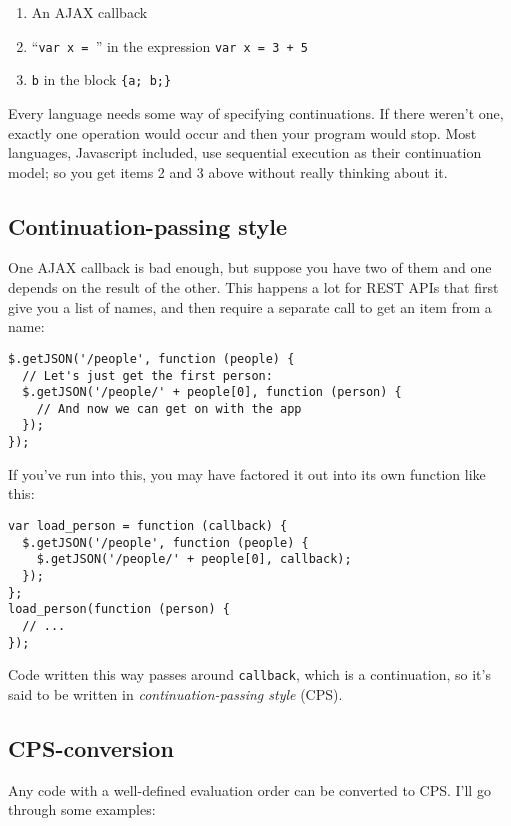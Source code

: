 \documentclass{article}
\begin{document}
\begin{enumerate}
\item{An AJAX callback}
\item{``{\tt var x = }'' in the expression {\tt var x = 3 + 5}}
\item{{\tt b} in the block \verb|{a; b;}|}
\end{enumerate}

    Every language needs some way of specifying continuations. If there weren't one, exactly one operation would occur and then your program would stop. Most languages, Javascript included,
    use sequential execution as their continuation model; so you get items 2 and 3 above without really thinking about it.

\subsection{Continuation-passing style}\label{sec:introducing-continuations-continuation-passing-style}
    One AJAX callback is bad enough, but suppose you have two of them and one depends on the result of the other. This happens a lot for REST APIs that first give you a list of names, and then
    require a separate call to get an item from a name:

\begin{verbatim}
$.getJSON('/people', function (people) {
  // Let's just get the first person:
  $.getJSON('/people/' + people[0], function (person) {
    // And now we can get on with the app
  });
});
\end{verbatim}

    If you've run into this, you may have factored it out into its own function like this:

\begin{verbatim}
var load_person = function (callback) {
  $.getJSON('/people', function (people) {
    $.getJSON('/people/' + people[0], callback);
  });
};
load_person(function (person) {
  // ...
});
\end{verbatim}

    Code written this way passes around {\tt callback}, which is a continuation, so it's said to be written in {\em continuation-passing style} (CPS).

\subsection{CPS-conversion}\label{sec:introducing-continuations-cps-conversion}
    Any code with a well-defined evaluation order can be converted to CPS. I'll go through some examples:
\end{document}
